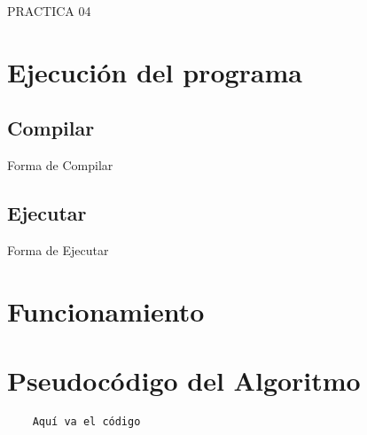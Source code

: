 \documentclass[a4paper,12pt]{article}
\begin{document}


\newpage

\begin{center}
    {\huge PRACTICA 04}
\end{center}

\section*{Ejecución del programa}

\subsection*{Compilar}
\begin{center}    
    Forma de Compilar 
\end{center}

\subsection*{Ejecutar}
\begin{center}
    Forma de Ejecutar
\end{center}

\section*{Funcionamiento}



\section*{Pseudocódigo del Algoritmo}


\begin{verbatim}
    Aquí va el código 
\end{verbatim}

\end{document}
